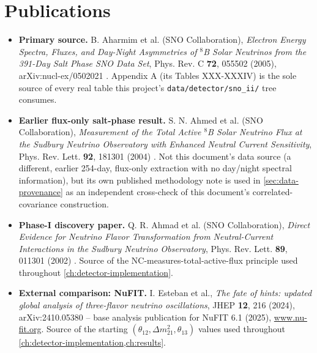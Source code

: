 \label{ch:data-release}

\section{Publications}

\begin{refbox}
\begin{itemize}
  \item \textbf{Primary source.} B. Aharmim et al. (SNO Collaboration),
    \emph{Electron Energy Spectra, Fluxes, and Day-Night Asymmetries of
    $^8$B Solar Neutrinos from the 391-Day Salt Phase SNO Data Set}, Phys.
    Rev. C \textbf{72}, 055502 (2005), arXiv:nucl-ex/0502021
    \parencite{Aharmim2005SaltPhase}. Appendix A (its Tables XXX-XXXIV) is
    the sole source of every real table this project's
    \texttt{data/detector/sno\_ii/} tree consumes.
  \item \textbf{Earlier flux-only salt-phase result.} S. N. Ahmed et al.
    (SNO Collaboration), \emph{Measurement of the Total Active $^8$B Solar
    Neutrino Flux at the Sudbury Neutrino Observatory with Enhanced Neutral
    Current Sensitivity}, Phys. Rev. Lett. \textbf{92}, 181301 (2004)
    \parencite{Ahmed2004SaltFlux}. Not this document's data source (a
    different, earlier 254-day, flux-only extraction with no day/night
    spectral information), but its own published methodology note is used
    in \cref{sec:data-provenance} as an independent cross-check of this
    document's correlated-covariance construction.
  \item \textbf{Phase-I discovery paper.} Q. R. Ahmad et al. (SNO
    Collaboration), \emph{Direct Evidence for Neutrino Flavor
    Transformation from Neutral-Current Interactions in the Sudbury
    Neutrino Observatory}, Phys. Rev. Lett. \textbf{89}, 011301 (2002)
    \parencite{Ahmad2002NCDiscovery}. Source of the NC-measures-total-active-flux
    principle used throughout \cref{ch:detector-implementation}.
  \item \textbf{External comparison: NuFIT.} I. Esteban et al., \emph{The
    fate of hints: updated global analysis of three-flavor neutrino
    oscillations}, JHEP \textbf{12}, 216 (2024), arXiv:2410.05380
    \parencite{EstebanNuFit2024} -- base analysis publication for NuFIT 6.1
    (2025), \url{www.nu-fit.org}. Source of the starting $(\theta_{12},
    \Delta m^2_{21},\theta_{13})$ values used throughout
    \cref{ch:detector-implementation,ch:results}.
\end{itemize}
\end{refbox}

